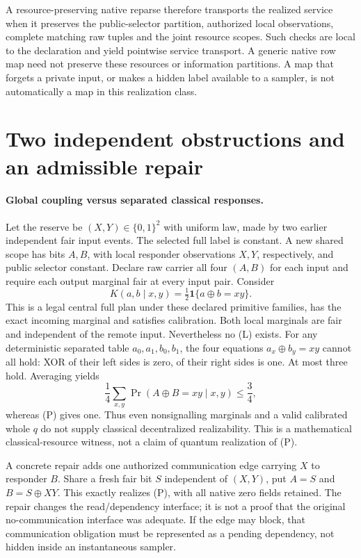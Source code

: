 \documentclass[11pt]{article}
\begin{document}
A resource-preserving native reparse therefore transports the realized service when it preserves the public-selector partition, authorized local observations, complete matching raw tuples and the joint resource scopes. Such checks are local to the declaration and yield pointwise service transport. A generic native row map need not preserve these resources or information partitions. A map that forgets a private input, or makes a hidden label available to a sampler, is not automatically a map in this realization class.

\section{Two independent obstructions and an admissible repair}
\paragraph{Global coupling versus separated classical responses.}
Let the reserve be $(X,Y)\in\{0,1\}^2$ with uniform law, made by two earlier independent fair input events. The selected full label is constant. A new shared scope has bits $A,B$, with local responder observations $X,Y$, respectively, and public selector constant. Declare raw carrier all four $(A,B)$ for each input and require each output marginal fair at every input pair. Consider
\[
 K(a,b\mid x,y)=\tfrac12\mathbf1\{a\oplus b=xy\}.
\tag{P}
\]
This is a legal central full plan under these declared primitive families, has the exact incoming marginal and satisfies calibration. Both local marginals are fair and independent of the remote input. Nevertheless no (L) exists. For any deterministic separated table $a_0,a_1,b_0,b_1$, the four equations $a_x\oplus b_y=xy$ cannot all hold: XOR of their left sides is zero, of their right sides is one. At most three hold. Averaging yields
\[
 \frac14\sum_{x,y}\Pr(A\oplus B=xy\mid x,y)\leq\frac34,
\]
whereas (P) gives one. Thus even nonsignalling marginals and a valid calibrated whole $q$ do not supply classical decentralized realizability. This is a mathematical classical-resource witness, not a claim of quantum realization of (P).

A concrete repair adds one authorized communication edge carrying $X$ to responder $B$. Share a fresh fair bit $S$ independent of $(X,Y)$, put $A=S$ and $B=S\oplus XY$. This exactly realizes (P), with all native zero fields retained. The repair changes the read/dependency interface; it is not a proof that the original no-communication interface was adequate. If the edge may block, that communication obligation must be represented as a pending dependency, not hidden inside an instantaneous sampler.
\end{document}
